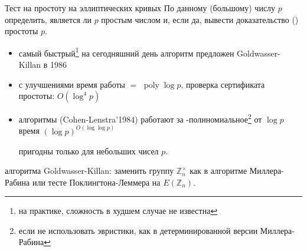 \documentclass{beamer}
\begin{document}
\begin{frame}{Тест на простоту на эллиптических кривых}
 По данному (большому) числу $p$ определить, является ли $p$ простым числом и, если да, вывести доказательство () простоты $p$.

\vspace*{0.5em}

\begin{itemize}
    \item самый быстрый\footnote{на практике, сложность в худшем случае не известна} на сегодняшний день алгоритм предложен Goldwasser-Killan в 1986
    \item с улучшениями время работы $=$ $\operatorname{poly}\log p$, проверка сертификата простоты: $O(\log^4 p)$
\end{itemize}
\end{frame}

\begin{frame}
\begin{itemize}
\item {} алгоритмы (Cohen-Lenstra'1984) работают за -полиномиальное\footnote{если не использовать эвристики, как в детерминированной версии Миллера-Рабина} от $\log p$ время $(\log p)^{O(\log\log p)}$

\structure{$\implies$} пригодны только для небольших чисел $p$.
\end{itemize}

\vspace{1em}
 алгоритма Goldwasser-Killan: заменить группу $\mathbb{Z}_n^\times$ как в алгоритме Миллера-Рабина или тесте Поклингтона-Леммера на $E(\mathbb{Z}_n)$.
\end{frame}
\end{document}
